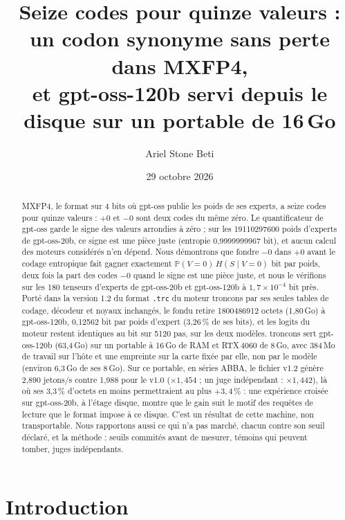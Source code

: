 \documentclass[11pt, a4paper]{article}
\title{Seize codes pour quinze valeurs : un codon synonyme sans perte dans MXFP4,\texorpdfstring{\\}{ }
et gpt-oss-120b servi depuis le disque sur un portable de \texorpdfstring{16\,Go}{16 Go}}
\author{Ariel Stone Beti}
\date{29 octobre 2026}
\theoremstyle{remark}
\newcommand{\Prob}{\mathbb{P}}
\begin{document}
\maketitle

\begin{abstract}
MXFP4, le format sur 4 bits où gpt-oss publie les poids de ses experts, a seize codes pour quinze valeurs : $+0$ et $-0$ sont deux codes du même zéro. Le quantificateur de gpt-oss garde le signe des valeurs arrondies à zéro ; sur les \num{19110297600} poids d'experts de gpt-oss-20b, ce signe est une pièce juste (entropie 0,9999999967 bit), et aucun calcul des moteurs considérés n'en dépend. Nous démontrons que fondre $-0$ dans $+0$ avant le codage entropique fait gagner exactement $\Prob(V = 0)\,H(S \mid V = 0)$ bit par poids, deux fois la part des codes $-0$ quand le signe est une pièce juste, et nous le vérifions sur les 180 tenseurs d'experts de gpt-oss-20b et gpt-oss-120b à $1{,}7 \times 10^{-4}$ bit près. Porté dans la version 1.2 du format \texttt{.trc} du moteur troncons par ses seules tables de codage, décodeur et noyaux inchangés, le fondu retire \num{1800486912} octets (1,80\,Go) à gpt-oss-120b, 0,12562 bit par poids d'expert (3,26\,\% de ses bits), et les logits du moteur restent identiques au bit sur \num{5120} pas, sur les deux modèles. troncons sert gpt-oss-120b (63,4\,Go) sur un portable à 16\,Go de RAM et RTX\,4060 de 8\,Go, avec 384\,Mo de travail sur l'hôte et une empreinte sur la carte fixée par elle, non par le modèle (environ 6,3\,Go de ses 8\,Go). Sur ce portable, en séries ABBA, le fichier v1.2 génère 2,890 jetons/s contre 1,988 pour le v1.0 ($\times 1{,}454$ ; un juge indépendant : $\times 1{,}442$), là où ses 3,3\,\% d'octets en moins permettraient au plus $+3{,}4\,\%$ : une expérience croisée sur gpt-oss-20b, à l'étage disque, montre que le gain suit le motif des requêtes de lecture que le format impose à ce disque. C'est un résultat de cette machine, non transportable. Nous rapportons aussi ce qui n'a pas marché, chacun contre son seuil déclaré, et la méthode : seuils commités avant de mesurer, témoins qui peuvent tomber, juges indépendants.
\end{abstract}

\section{Introduction}\label{sec-intro}
\end{document}
